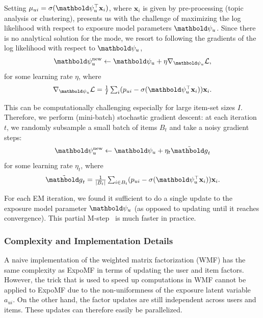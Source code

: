  Setting $\mu_{ui} = \sigma(\mb\psi_u^\top \mathbf{x}_i)$, where $\mathbf{x}_i$ is given by pre-processing (topic analysis or clustering), presents us with the challenge of maximizing the log likelihood with respect to exposure model parameters $\mb\psi_u$. Since there is no analytical solution for the mode, we resort to following the gradients of the log likelihood with respect to $\mb\psi_u$,
\begin{equation}
	\mb\psi_u^{\text{new}} \leftarrow \mb\psi_u + \eta \nabla_{\mb\psi_u} \mathcal{L}, %
	\label{eq:update_psi}
\end{equation}
for some learning rate $\eta$, where
\begin{equation}
	\nabla_{\mb\psi_u} \mathcal{L} = \textstyle \frac{1}{I}\sum_i ( p_{ui} - \sigma(\mb\psi_u^\top \mathbf{x}_i))\mathbf{x}_i.
\end{equation}

This can be computationally challenging especially for large item-set sizes $I$. Therefore, we perform (mini-batch) stochastic gradient descent: at each iteration $t$, we randomly subsample a small batch of items $B_t$ and take a noisy gradient steps:
\begin{equation} \label{eq:update_psi_sgd}
\mb\psi_u^{\text{new}} \leftarrow \mb\psi_u + \eta_t \tilde{\mb{g}}_t
\end{equation}
for some learning rate $\eta_t$, where
\begin{equation}
\tilde{\mb{g}}_t = \textstyle \frac{1}{|B_t|}\sum_{i \in B_t} (p_{ui} - \sigma(\mb\psi_u^\top \mathbf{x}_i)) \mathbf{x}_i.
\end{equation}

For each EM iteration, we found it sufficient to do a single update to the
exposure model parameter $\mb\psi_u$ (as opposed to updating until it
reaches convergence). This partial M-step~\cite{neal1998view} is much faster in
practice. 

\subsubsection*{Complexity and Implementation Details}

A naive implementation of the weighted matrix factorization (WMF) \cite{hu2008collaborative} has the same complexity as ExpoMF in terms of updating the user and item factors. However, the trick that is used to speed up computations in WMF cannot be applied to ExpoMF due to the non-uniformness of the exposure latent variable $a_{ui}$. On the other hand, the factor updates are still independent across users and items. These updates can therefore easily be parallelized.

